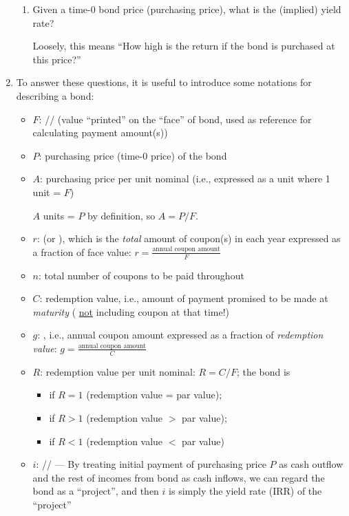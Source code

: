 \begin{enumerate}
\begin{enumerate}
\item Given a time-0 bond price (purchasing price), what is the (implied) yield rate?
\begin{note}
Loosely, this means ``How high is the return if the bond is purchased at this
price?''
\end{note}
\end{enumerate}
\item To answer these questions, it is useful to introduce some notations for
describing a bond:
\begin{itemize}
\item \(F\): // (value
``printed'' on the ``face'' of bond, used as reference for calculating payment
amount(s))
\item \(P\): purchasing price (time-0 price) of the bond
\item \(A\): purchasing price per unit nominal (i.e., expressed as a unit where 1 unit = \(F\))

\begin{note}
\(A\) units = \(P\) by definition, so \(A=P/F\).
\end{note}
\item \(r\):  (or ), which is the
\emph{total} amount of coupon(s) in each year expressed as a fraction of face value:
\(\displaystyle r=\frac{\text{annual coupon amount}}{F}\)
\item \(n\): total number of coupons to be paid throughout
\item \(C\): redemption value, i.e., amount of payment promised to be made at
\emph{maturity} (\warn{} \underline{not} including coupon at that time!)
\item \(g\): , i.e., annual coupon amount expressed
as a fraction of \emph{redemption value}: \(\displaystyle g=\frac{\text{annual coupon amount}}{C}\)
\item \(R\): redemption value per unit nominal: \(R=C/F\); the bond is
\begin{itemize}
\item {} if \(R=1\) (redemption value = par value);
\item {} if \(R>1\) (redemption value \(>\) par value);
\item {} if \(R<1\) (redemption value \(<\) par value)
\end{itemize}
\item \(i\): // --- By treating initial payment of purchasing price \(P\)  as cash
outflow and the rest of incomes from bond as cash inflows, we can regard the
bond as a ``project'', and then \(i\) is simply the yield rate (IRR) of the
``project''


\end{itemize}
\end{enumerate}
